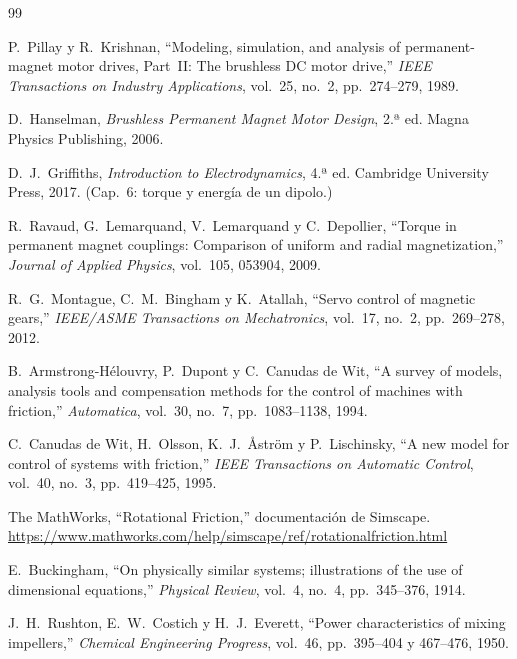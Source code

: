 \documentclass[11pt,a4paper,oneside]{report}
\theoremstyle{definition}
\theoremstyle{remark}
\begin{document}
\begin{thebibliography}{99}

P.~Pillay y R.~Krishnan,
``Modeling, simulation, and analysis of permanent-magnet motor drives,
Part~II: The brushless DC motor drive,''
\emph{IEEE Transactions on Industry Applications}, vol.~25, no.~2,
pp.~274--279, 1989.

D.~Hanselman,
\emph{Brushless Permanent Magnet Motor Design}, 2.ª ed.
Magna Physics Publishing, 2006.

D.~J.~Griffiths,
\emph{Introduction to Electrodynamics}, 4.ª ed.
Cambridge University Press, 2017. (Cap.~6: torque y energía de un dipolo.)

R.~Ravaud, G.~Lemarquand, V.~Lemarquand y C.~Depollier,
``Torque in permanent magnet couplings: Comparison of uniform and radial
magnetization,''
\emph{Journal of Applied Physics}, vol.~105, 053904, 2009.

R.~G.~Montague, C.~M.~Bingham y K.~Atallah,
``Servo control of magnetic gears,''
\emph{IEEE/ASME Transactions on Mechatronics}, vol.~17, no.~2,
pp.~269--278, 2012.

B.~Armstrong-Hélouvry, P.~Dupont y C.~Canudas de Wit,
``A survey of models, analysis tools and compensation methods for the control
of machines with friction,''
\emph{Automatica}, vol.~30, no.~7, pp.~1083--1138, 1994.

C.~Canudas de Wit, H.~Olsson, K.~J.~Åström y P.~Lischinsky,
``A new model for control of systems with friction,''
\emph{IEEE Transactions on Automatic Control}, vol.~40, no.~3,
pp.~419--425, 1995.

The MathWorks,
``Rotational Friction,'' documentación de Simscape.\\
\url{https://www.mathworks.com/help/simscape/ref/rotationalfriction.html}

E.~Buckingham,
``On physically similar systems; illustrations of the use of dimensional
equations,''
\emph{Physical Review}, vol.~4, no.~4, pp.~345--376, 1914.

J.~H.~Rushton, E.~W.~Costich y H.~J.~Everett,
``Power characteristics of mixing impellers,''
\emph{Chemical Engineering Progress}, vol.~46, pp.~395--404 y 467--476, 1950.


\end{thebibliography}
\end{document}

